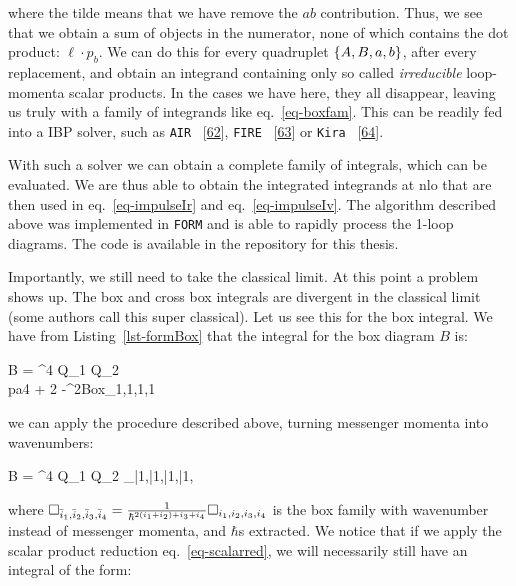 \documentclass[
  11pt,
  a4paper,
  DIV=11,
  numbers=noendperiod,
  twoside]{scrreprt}
\let\[\relax \let\]\relax %
\DeclareRobustCommand{\[}{\begin{equation}}
\DeclareRobustCommand{\]}{\end{equation}}
\begin{document}
where the tilde means that we have remove the \(ab\) contribution. Thus,
we see that we obtain a sum of objects in the numerator, none of which
contains the dot product: \(\ell\cdot p_b\). We can do this for every
quadruplet \(\{A,B,a,b \}\), after every replacement, and obtain an
integrand containing only so called \emph{irreducible} loop-momenta
scalar products. In the cases we have here, they all disappear, leaving
us truly with a family of integrands like eq.~\ref{eq-boxfam}. This can
be readily fed into a IBP solver, such as \texttt{AIR}
~{[}\protect\hyperlink{ref-Anastasiou:2004}{62}{]}, \texttt{FIRE}
~{[}\protect\hyperlink{ref-Smirnov:2020}{63}{]} or \texttt{Kira}
~{[}\protect\hyperlink{ref-Maierhofer:2018}{64}{]}.

With such a solver we can obtain a complete family of integrals, which
can be evaluated. We are thus able to obtain the integrated integrands
at \gls{nlo} that are then used in eq.~\ref{eq-impulseIr} and
eq.~\ref{eq-impulseIv}. The algorithm described above was implemented in
\texttt{FORM} and is able to rapidly process the 1-loop diagrams. The
code is available in the repository for this thesis.

Importantly, we still need to take the classical limit. At this point a
problem shows up. The box and cross box integrals are divergent in the
classical limit (some authors call this super classical). Let us see
this for the box integral. We have from Listing~\ref{lst-formBox} that
the integral for the box diagram \(B\) is:

\[
\im B = \elch^4 Q_{1} Q_{2} \int \dn[D]{\ell} \\pa{4 \semom[1]\cdot \semom[2]  + 2\ell\cdot\pa{\semom[2] -\semom[1]} -\pa{\tm-\ell}^2}Box_{1,1,1,1}
\]

we can apply the procedure described above, turning messenger momenta
into wavenumbers:

\[
\im B = \elch^4 Q_{1} Q_{2} \int \dn[D]{\bar{\ell}} \Box_{\bar{1},\bar{1},\bar{1},\bar{1}},
\]

where
\(\Box_{\bar{i}_1,\bar{i}_2,\bar{i}_3,\bar{i}_4} =\frac{1}{\hbar^{2(i_1+i_2)+i_3+i_4}} \Box_{i_1,i_2,i_3,i_4}\)
is the box family with wavenumber instead of messenger momenta, and
\(\hbar\)s extracted. We notice that if we apply the scalar product
reduction eq.~\ref{eq-scalarred}, we will necessarily still have an
integral of the form:
\end{document}
